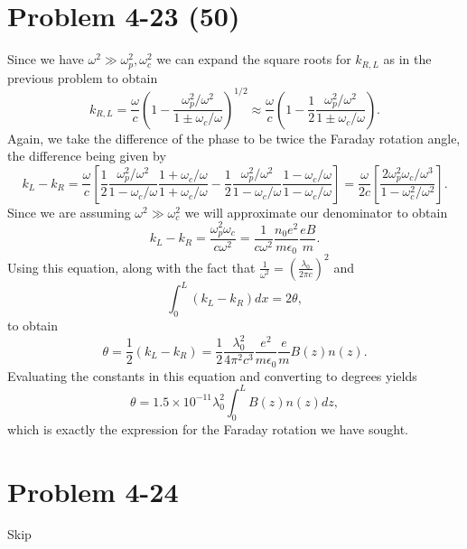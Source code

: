 \section*{Problem 4-23 (50)}
\label{sec:4-23}
Since we have \(\omega^2 \gg \omega_p^2,\omega^2_c \) we can expand the square roots for \(k_{R,L} \) as in the previous problem to obtain
\begin{equation*}
	k_{R,L} = \dfrac{\omega}{c}\left(1 - \dfrac{\omega_p^2/\omega^2}{1 \pm \omega_c/\omega} \right)^{1/2} \approx \dfrac{\omega}{c} \left(1 - \dfrac{1}{2}\dfrac{\omega_p^2/\omega^2}{1 \pm \omega_c/\omega} \right).
\end{equation*}
Again, we take the difference of the phase to be twice the Faraday rotation angle, the difference being given by
\begin{equation*}
	k_L - k_R = \dfrac{\omega}{c}\left[\dfrac{1}{2}\dfrac{\omega_p^2/\omega^2}{1 - \omega_c/\omega}\dfrac{1 + \omega_c/\omega}{1 + \omega_c/\omega} - \dfrac{1}{2}\dfrac{\omega_p^2/\omega^2}{1 - \omega_c/\omega}\dfrac{1 - \omega_c/\omega}{1 - \omega_c/\omega}  \right] = \dfrac{\omega}{2c}\left[\dfrac{2\omega_p^2\omega_c/\omega^3}{1 - \omega_c^2/\omega^2} \right].
\end{equation*}
Since we are assuming \(\omega^2 \gg \omega_c^2  \) we will approximate our denominator to obtain
\begin{equation*}
	k_L-k_R = \dfrac{\omega^2_p\omega_c}{c\omega^2} = \dfrac{1}{c\omega^2}\dfrac{n_0e^2}{m\epsilon_0}\dfrac{eB}{m}.
\end{equation*}
Using this equation, along with the fact that \(\frac{1}{\omega^2} = \left(\frac{\lambda_0}{2\pi c}\right)^2 \) and 
\begin{equation*}
	\int_0^L (k_L - k_R)dx = 2\theta,
\end{equation*}
to obtain
\begin{equation*}
	\theta = \dfrac{1}{2}\left(k_L - k_R\right) = \dfrac{1}{2}\dfrac{\lambda_0^2}{4\pi^2c^3}\dfrac{e^2}{m\epsilon_0}\dfrac{e}{m}B(z)n(z).
\end{equation*}
Evaluating the constants in this equation and converting to degrees yields
\begin{equation*}
	\theta = 1.5\times10^{-11}\lambda_0^2\int_{0}^{L}B(z)n(z)dz,
\end{equation*}
which is exactly the expression for the Faraday rotation we have sought. 

\section*{Problem 4-24}
\label{sec:4-24}
Skip


